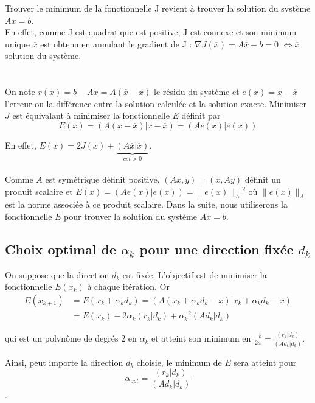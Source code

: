 \documentclass[french]{article}
\begin{document}
Trouver le minimum de la fonctionnelle J revient à trouver la solution
du système $Ax=b$. \\
En effet, comme J est quadratique est positive, J est connexe et son
minimum unique $\overline{x}$ est obtenu en annulant le gradient
de J : $\nabla J(\overline{x})=A\overline{x}-b=0$ $\iff\overline{x}$
solution du système.\\
\\
\\
On note $r(x)=b-Ax=A(\overline{x}-x)$ le résidu du système et $e(x)=x-\overline{x}$
l'erreur ou la différence entre la solution calculée et la solution
exacte. Minimiser $J$ est équivalant à minimiser la fonctionnelle
$E$ définit par
\begin{equation}
E(x)=(A(x-\overline{x})|x-\overline{x})=(Ae(x)|e(x))
\end{equation}

En effet, $E(x)=2J(x)+\underbrace{(A\overline{x}|\overline{x})}_{cst>0}$.
\\
\\

Comme $A$ est symétrique définit positive, $(Ax,y)=(x,Ay)$ définit
un produit scalaire et $E(x)=(Ae(x)|e(x))=\parallel e(x)\parallel_{A}{{}^2}$
où $\parallel e(x)\parallel_{A}$ est la norme associée à ce produit
scalaire. Dans la suite, nous utiliserons la fonctionnelle $E$ pour
trouver la solution du système $Ax=b$.

\subsection{Choix optimal de $\alpha_{k}$ pour une direction fixée $d_{k}$}

On suppose que la direction $d_{k}$ est fixée. L'objectif est de
minimiser la fonctionnelle $E(x_{k})$ à chaque itération. Or
\begin{align*}
E(x_{k+1}) & =E(x_{k}+\alpha_{k}d_{k})=(A(x_{k}+\alpha_{k}d_{k}-\overline{x})|x_{k}+\alpha_{k}d_{k}-\overline{x})\\
 & =E(x_{k})-2\alpha_{k}(r_{k}|d_{k})+\alpha_{k}{{}^2}(Ad_{k}|d_{k})
\end{align*}

qui est un polynôme de degrés 2 en $\alpha_{k}$ et atteint son minimum
en $\frac{-b}{2a}=\frac{(r_{k}|d_{k})}{(Ad_{k}|d_{k})}$.

Ainsi, peut importe la direction $d_{k}$ choisie, le minimum de $E$
sera atteint pour 
\begin{equation}
\alpha_{opt}=\frac{(r_{k}|d_{k})}{(Ad_{k}|d_{k})}
\end{equation}
.
\end{document}
